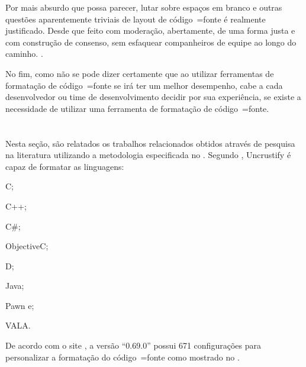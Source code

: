 %
\begin{citacao}
    Por mais absurdo que possa parecer,
    lutar sobre espaços em branco e
    outras questões aparentemente triviais de layout de código~=fonte é realmente justificado.
    Desde que feito com moderação,
    abertamente,
    de uma forma justa e
    com construção de consenso,
    sem esfaquear companheiros de equipe ao longo do caminho.
    \cite[tradução nossa\protect\footnotemark]{deathToTheSpaceInfidels}.
\end{citacao}

No fim,
como não se pode dizer certamente que ao utilizar ferramentas de formatação de código~=fonte se irá ter um melhor desempenho,
cabe a cada desenvolvedor ou
time de desenvolvimento decidir por sua experiência,
se existe a necessidade de utilizar uma ferramenta de formatação de código~=fonte.


\section{}
\label{section:trabalhosRelacionados}

Nesta seção,
são relatados os trabalhos relacionados obtidos através de pesquisa na literatura utilizando a metodologia especificada no .
Segundo ,
Uncrustify é capaz de formatar as linguagens:
\begin{inparaenum}[1)]
\item C;
\item C++;
\item C\#;
\item ObjectiveC;
\item D;
\item Java;
\item Pawn e;
\item VALA.
\end{inparaenum}%
De acordo com o site ,
a versão ``0.69.0'' possui 671 configurações para personalizar a formatação do código~=fonte como mostrado no .

